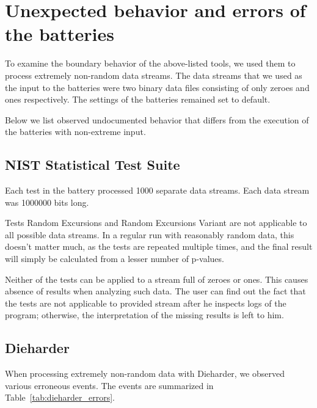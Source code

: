 \documentclass[
  digital,  	%
  color,		%
  oneside,   	%
  12pt,
  nocover,
  notable,
  nolof,
  nolot,
]{fithesis3}
\begin{document}
\section{Unexpected behavior and errors of the batteries}
To examine the boundary behavior of the above-listed tools, we used them to process extremely non-random data streams. The data streams that we used as the input to the batteries were two binary data files consisting of only zeroes and ones respectively. The settings of the batteries remained set to default. 

Below we list observed undocumented behavior that differs from the execution of the batteries with non-extreme input.

\subsection*{NIST Statistical Test Suite}
Each test in the battery processed 1000 separate data streams. Each data stream was 1000000 bits long.

Tests Random Excursions and Random Excursions Variant are not applicable to all possible data streams. In a regular run with reasonably random data, this doesn't matter much, as the tests are repeated multiple times, and the final result will simply be calculated from a lesser number of p-values. 

Neither of the tests can be applied to a stream full of zeroes or ones. This causes absence of results when analyzing such data. The user can find out the fact that the tests are not applicable to provided stream after he inspects logs of the program; otherwise, the interpretation of the missing results is left to him.

\subsection*{Dieharder}
When processing extremely non-random data with Dieharder, we observed various erroneous events. The events are summarized in Table~\ref{tab:dieharder_errors}. 
\end{document}
